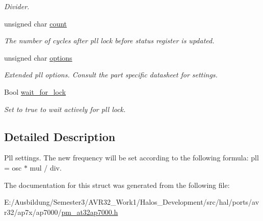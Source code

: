 \begin{CompactItemize}
\begin{CompactList}\small\item\em Divider. \item\end{CompactList}\item 
\hypertarget{structpm__pll__opt__t_11ff9f83ef3be9fda30369640c0a4017}{
unsigned char \hyperlink{structpm__pll__opt__t_11ff9f83ef3be9fda30369640c0a4017}{count}}
\label{structpm__pll__opt__t_11ff9f83ef3be9fda30369640c0a4017}

\begin{CompactList}\small\item\em The number of cycles after pll lock before status register is updated. \item\end{CompactList}\item 
\hypertarget{structpm__pll__opt__t_8b17faeaff4786ba22e3192e35e847be}{
unsigned char \hyperlink{structpm__pll__opt__t_8b17faeaff4786ba22e3192e35e847be}{options}}
\label{structpm__pll__opt__t_8b17faeaff4786ba22e3192e35e847be}

\begin{CompactList}\small\item\em Extended pll options. Consult the part specific datasheet for settings. \item\end{CompactList}\item 
\hypertarget{structpm__pll__opt__t_8c3eee8741e28978aa4a3618307499a2}{
Bool \hyperlink{structpm__pll__opt__t_8c3eee8741e28978aa4a3618307499a2}{wait\_\-for\_\-lock}}
\label{structpm__pll__opt__t_8c3eee8741e28978aa4a3618307499a2}

\begin{CompactList}\small\item\em Set to true to wait actively for pll lock. \item\end{CompactList}\end{CompactItemize}


\subsection{Detailed Description}
Pll settings. The new frequency will be set according to the following formula: pll = osc $\ast$ mul / div. 

The documentation for this struct was generated from the following file:\begin{CompactItemize}
\item 
E:/Ausbildung/Semester3/AVR32\_\-Work1/Halos\_\-Development/src/hal/ports/avr32/ap7x/ap7000/\hyperlink{pm__at32ap7000_8h}{pm\_\-at32ap7000.h}\end{CompactItemize}
